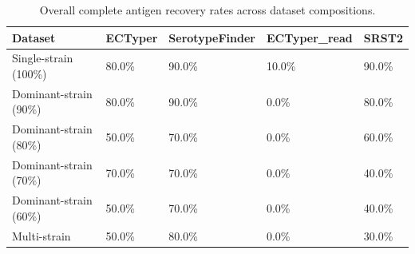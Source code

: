 \begin{table}[!ht]
\centering
\caption{Overall complete antigen recovery rates across dataset compositions.}
\label{tab:Complete_accuracy}

\begin{tabular}{lllll}
\toprule
Dataset & ECTyper & SerotypeFinder & ECTyper_read & SRST2\\
\midrule
Single-strain (100\%) & 80.0\% & 90.0\% & 10.0\% & 90.0\%\\
Dominant-strain (90\%) & 80.0\% & 90.0\% & 0.0\% & 80.0\%\\
Dominant-strain (80\%) & 50.0\% & 70.0\% & 0.0\% & 60.0\%\\
Dominant-strain (70\%) & 70.0\% & 70.0\% & 0.0\% & 40.0\%\\
Dominant-strain (60\%) & 50.0\% & 70.0\% & 0.0\% & 40.0\%\\
\addlinespace
Multi-strain & 50.0\% & 80.0\% & 0.0\% & 30.0\%\\
\bottomrule
\end{tabular}
\end{table}
